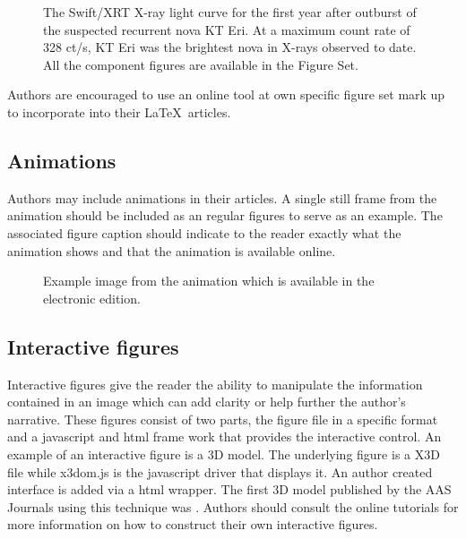 \documentclass{aastex6}
\newcommand\latex{La\TeX}
\begin{document}
\figsetend

\begin{figure}
\caption{The Swift/XRT X-ray light curve for the first year after
outburst of the suspected recurrent nova KT Eri. At a maximum count rate of
328 ct/s, KT Eri was the brightest nova in X-rays observed to date. All
the component figures are available in the Figure Set. \label{fig:fig4}}
\end{figure}

Authors are encouraged to use an online tool at
own specific figure set mark up to incorporate into their \latex\ articles.

\subsection{Animations}

Authors may include animations in their articles.  A single still frame from
the animation should be included as an regular figures to serve as an example.
The associated figure caption should indicate to the reader exactly what the
animation shows and that the animation is available online.

\begin{figure}
\caption{Example image from the animation which is available in the electronic
edition.}
\end{figure}

\subsection{Interactive figures}

Interactive figures give the reader the ability to manipulate the
information contained in an image which can add clarity or help further the
author's narrative.  These figures consist of two parts, the figure file in
a specific format and a javascript and html frame work that provides the
interactive control.  An example of an interactive figure is a 3D model.
The underlying figure is a X3D file while x3dom.js is the javascript driver
that displays it. An author created interface is added via a html wrapper.
The first 3D model published by the AAS Journals using this technique was
\citet{2014ApJ...793..127V}.  Authors should consult the online tutorials
for more information on how to construct their own interactive figures.
\end{document}
